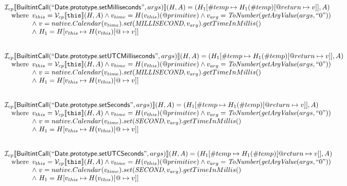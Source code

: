 \[
\begin{array}{l}

\mathcal{I} _{cp}\llbracket \mbox{\textsf{BuiltintCall}}(``\mbox{\textsf{Date.prototype.setMilliseconds}}",args)\rrbracket(H,A)
  = (H_1[\#temp \mapsto H_1(\#temp)[@return \mapsto v]], A)\\
\quad{\rm where}\begin{array}[t]{l}
  v_{this} = \mathcal{V} _{cp}\llbracket \mbox{\texttt{this}}\rrbracket (H,A) \land v_{time} = H(v_{this})(@primitive)
  \land v_{arg} = \emph{ToNumber}(\emph{getArgValue}(args, ``0"))\\
  \land\ v = native.Calendar(v_{time}).set(\emph{MILLISECOND}, v_{arg}).getTimeInMillis() \\
  \land\ H_1 = H[v_{this} \mapsto H(v_{this})[@\mapsto v]]
  \end{array}\\
\\\\


\mathcal{I} _{cp}\llbracket \mbox{\textsf{BuiltintCall}}(``\mbox{\textsf{Date.prototype.setUTCMilliseconds}}",args)\rrbracket(H,A)
  = (H_1[\#temp \mapsto H_1(\#temp)[@return \mapsto v]], A)\\
\quad{\rm where}\begin{array}[t]{l}
  v_{this} = \mathcal{V} _{cp}\llbracket \mbox{\texttt{this}}\rrbracket (H,A) \land v_{time} = H(v_{this})(@primitive)
  \land v_{arg} = \emph{ToNumber}(\emph{getArgValue}(args, ``0"))\\
  \land\ v = native.Calendar(v_{time}).set(\emph{MILLISECOND}, v_{arg}).getTimeInMillis()\\
  \land\ H_1 = H[v_{this} \mapsto H(v_{this})[@\mapsto v]]
  \end{array}\\
\\\\
\mathcal{I} _{cp}\llbracket \mbox{\textsf{BuiltintCall}}(``\mbox{\textsf{Date.prototype.setSeconds}}",args)\rrbracket(H,A)
  = (H_1[\#temp \mapsto H_1(\#temp)[@return \mapsto v]], A)\\
\quad{\rm where}\begin{array}[t]{l}
  v_{this} = \mathcal{V} _{cp}\llbracket \mbox{\texttt{this}}\rrbracket (H,A) \land v_{time} = H(v_{this})(@primitive)
  \land v_{arg} = \emph{ToNumber}(\emph{getArgValue}(args, ``0"))\\
  \land\ v = native.Calendar(v_{time}).set(\emph{SECOND}, v_{arg}).getTimeInMillis()\\
  \land\ H_1 = H[v_{this} \mapsto H(v_{this})[@\mapsto v]]
  \end{array}\\
\\\\


\mathcal{I} _{cp}\llbracket \mbox{\textsf{BuiltintCall}}(``\mbox{\textsf{Date.prototype.setUTCSeconds}}",args)\rrbracket(H,A)
  = (H_1[\#temp \mapsto H_1(\#temp)[@return \mapsto v]], A)\\
\quad{\rm where}\begin{array}[t]{l}
  v_{this} = \mathcal{V} _{cp}\llbracket \mbox{\texttt{this}}\rrbracket (H,A) \land v_{time} = H(v_{this})(@primitive)
  \land v_{arg} = \emph{ToNumber}(\emph{getArgValue}(args, ``0"))\\
  \land\ v = native.Calendar(v_{time}).set(\emph{SECOND}, v_{arg}).getTimeInMillis()\\
  \land\ H_1 = H[v_{this} \mapsto H(v_{this})[@\mapsto v]]
  \end{array}\\
\\\\


\end{array}\]
